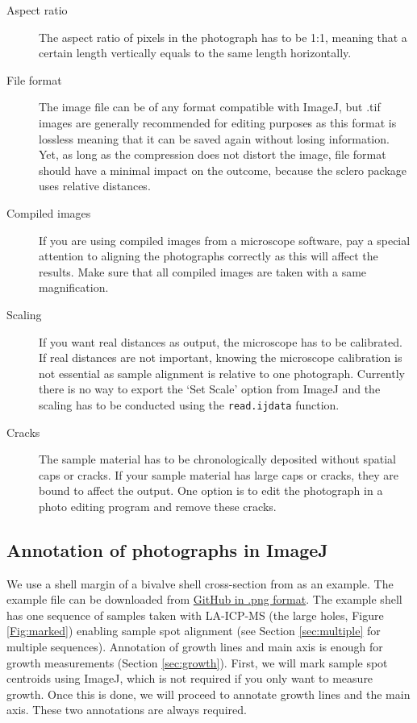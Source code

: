 \documentclass[11pt, a4paper]{article}
\begin{document}
\begin{description}
\item[Aspect ratio] The aspect ratio of pixels in the photograph has to be 1:1, meaning that a certain length vertically equals to the same length horizontally.
\item[File format] The image file can be of any format compatible with ImageJ, but .tif images are generally recommended for editing purposes as this format is lossless meaning that it can be saved again without losing information. Yet, as long as the compression does not distort the image, file format should have a minimal impact on the outcome, because the sclero package uses relative distances.
\item[Compiled images] If you are using compiled images from a microscope software, pay a special attention to aligning the photographs correctly as this will affect the results. Make sure that all compiled images are taken with a same magnification.
\item[Scaling] If you want real distances as output, the microscope has to be calibrated. If real distances are not important, knowing the microscope calibration is not essential as sample alignment is relative to one photograph. Currently there is no way to export the `Set Scale' option from ImageJ and the scaling has to be conducted using the \texttt{read.ijdata} function.
\item[Cracks] The sample material has to be chronologically deposited without spatial caps or cracks. If your sample material has large caps or cracks, they are bound to affect the output. One option is to edit the photograph in a photo editing program and remove these cracks.
\end{description}

\subsection{Annotation of photographs in ImageJ}

We use a shell margin of a bivalve shell cross-section from \citealp{Vihtakari2016} as an example. The example file can be downloaded from \href{https://github.com/MikkoVihtakari/sclero/blob/master/inst/extdata/shellspots.png}{GitHub in .png format}. The example shell has one sequence of samples taken with LA-ICP-MS (the large holes, Figure \ref{Fig:marked}) enabling sample spot alignment (see Section \ref{sec:multiple} for multiple sequences). Annotation of growth lines and main axis is enough for growth measurements (Section \ref{sec:growth}). First, we will mark sample spot centroids using ImageJ, which is not required if you only want to measure growth. Once this is done, we will proceed to annotate growth lines and the main axis. These two annotations are always required.
\end{document}
